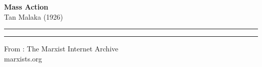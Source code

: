 \thispagestyle{empty}
    \begin{center}
        
            
        {\fontsize{50pt}{56pt}\selectfont \textbf{Mass Action}}\\
        \vspace*{1cm}
        {\Large Tan Malaka (1926)}
        \vspace*{1cm}

        \hrule

        \vfill

        \hrule
        \vspace*{1cm}

        {\large From : The Marxist Internet Archive\\ marxists.org}
        
    \end{center}
